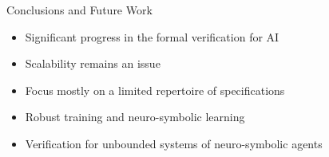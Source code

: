 \documentclass[10pt]{beamer}
\begin{document}


\begin{frame}{Conclusions and Future Work}

\begin{itemize} \itemsep 2em

    \item Significant progress in the formal verification for AI 

    \item Scalability remains an issue

    \item Focus mostly on a limited repertoire of specifications 

    \item Robust training and neuro-symbolic learning

    \item Verification for unbounded systems of neuro-symbolic agents
\end{itemize}










\end{frame}


\end{document}

